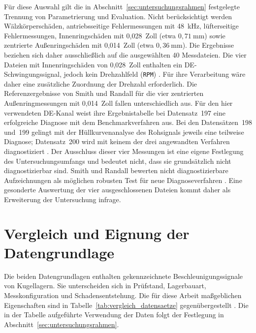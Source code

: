 Für diese Auswahl gilt die in Abschnitt~\ref{sec:untersuchungsrahmen}
festgelegte Trennung von Parametrierung und Evaluation.
Nicht berücksichtigt werden Wälzkörperschäden, antriebsseitige
Fehlermessungen mit 48~kHz, lüfterseitige Fehlermessungen,
Innenringschäden mit 0,028~Zoll (etwa $0{,}71~\mathrm{mm}$) sowie
zentrierte Außenringschäden mit 0,014~Zoll (etwa
$0{,}36~\mathrm{mm}$). Die Ergebnisse beziehen sich daher ausschließlich
auf die ausgewählten 40 Messdateien.
Die vier Dateien mit Innenringschäden von 0,028~Zoll enthalten ein
DE-Schwingungssignal, jedoch kein Drehzahlfeld (\texttt{RPM})
\cite{12kDriveEnd}. Für ihre Verarbeitung wäre daher eine zusätzliche
Zuordnung der Drehzahl erforderlich.
Die Referenzergebnisse von Smith und Randall für die vier zentrierten
Außenringmessungen mit 0,014~Zoll fallen unterschiedlich aus. Für den hier
verwendeten DE-Kanal weist ihre Ergebnistabelle bei Datensatz~197 eine
erfolgreiche Diagnose mit dem Benchmarkverfahren aus. Bei den
Datensätzen~198 und~199 gelingt mit der Hüllkurvenanalyse des Rohsignals
jeweils eine teilweise Diagnose; Datensatz~200 wird mit keinem der drei
angewandten Verfahren diagnostiziert
\cite[S.~107, Tab.~4; S.~128, Tab.~B2]
{smithRollingElementBearing2015}.
Der Ausschluss dieser vier Messungen ist eine eigene Festlegung des
Untersuchungsumfangs und bedeutet nicht, dass sie grundsätzlich nicht
diagnostizierbar sind.
Smith und Randall bewerten nicht diagnostizierbare Aufzeichnungen als
möglichen robusten Test für neue Diagnoseverfahren
\cite[S.~124, Abschn.~6.7]{smithRollingElementBearing2015}.
Eine gesonderte Auswertung der vier ausgeschlossenen Dateien kommt daher
als Erweiterung der Untersuchung infrage.

\section{Vergleich und Eignung der Datengrundlage}
\label{sec:eignung_datengrundlage}


Die beiden Datengrundlagen enthalten gekennzeichnete Beschleunigungssignale
von Kugellagern. Sie unterscheiden sich in Prüfstand, Lagerbauart,
Messkonfiguration und Schadensentstehung. Die für diese Arbeit maßgeblichen
Eigenschaften sind in Tabelle~\ref{tab:vergleich_datensaetze} gegenübergestellt
\cite[S.~102--103, Abschn.~3.1--3.2 und Tab.~2; S.~126, Tab.~A1--A2]
{smithRollingElementBearing2015}
\cite[S.~5--9, Abschn.~3--5, Abb.~4--5 und Tab.~4--7]
{lessmeierConditionMonitoringBearing2016}.
Die in der Tabelle aufgeführte Verwendung der Daten folgt der Festlegung in
Abschnitt~\ref{sec:untersuchungsrahmen}.

